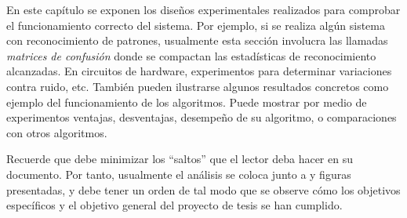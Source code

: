 En este capítulo se exponen los diseños experimentales realizados para
comprobar el funcionamiento correcto del sistema. Por ejemplo, si se
realiza algún sistema con reconocimiento de patrones, usualmente esta
sección involucra las llamadas \emph{matrices de confusión} donde se
compactan las estadísticas de reconocimiento alcanzadas. En circuitos
de hardware, experimentos para determinar variaciones contra ruido,
etc. También pueden ilustrarse algunos resultados concretos como
ejemplo del funcionamiento de los algoritmos. Puede mostrar por medio
de experimentos ventajas, desventajas, desempeño de su algoritmo, o
comparaciones con otros algoritmos.

Recuerde que debe minimizar los ``saltos'' que el lector deba hacer en
su documento. Por tanto, usualmente el análisis se coloca junto a
\tablas y figuras presentadas, y debe tener un orden de tal modo que se
observe cómo los objetivos específicos y el objetivo general del
proyecto de tesis se han cumplido.
